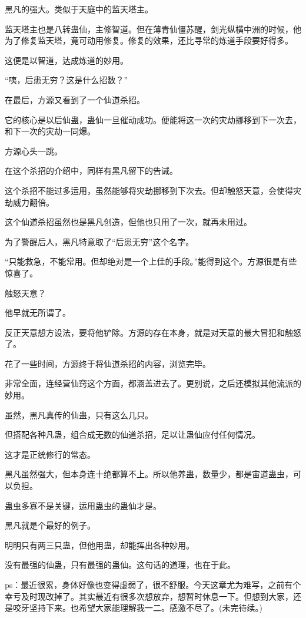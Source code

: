 \begin{this_body}
黑凡的强大。类似于天庭中的监天塔主。

监天塔主也是八转蛊仙，主修智道。但在薄青仙僵苏醒，剑光纵横中洲的时候，他为了修复监天塔，竟可动用修复。修复的效果，还比寻常的炼道手段要好得多。

这便是以智道，达成炼道的妙用。

“咦，后患无穷？这是什么招数？”

在最后，方源又看到了一个仙道杀招。

它的核心是以后仙蛊，蛊仙一旦催动成功。便能将这一次的灾劫挪移到下一次去，和下一次的灾劫一同爆。

方源心头一跳。

在这个杀招的介绍中，同样有黑凡留下的告诫。

这个杀招不能过多运用，虽然能够将灾劫挪移到下次去。但却触怒天意，会使得灾劫威力翻倍。

这个仙道杀招虽然也是黑凡创造，但他也只用了一次，就再未用过。

为了警醒后人，黑凡特意取了“后患无穷”这个名字。

“只能救急，不能常用。但却绝对是一个上佳的手段。”能得到这个。方源很是有些惊喜了。

触怒天意？

他早就无所谓了。

反正天意想方设法，要将他铲除。方源的存在本身，就是对天意的最大冒犯和触怒了。

花了一些时间，方源终于将仙道杀招的内容，浏览完毕。

非常全面，连经营仙窍这个方面，都涵盖进去了。更别说，之后还模拟其他流派的妙用。

虽然，黑凡真传的仙蛊，只有这么几只。

但搭配各种凡蛊，组合成无数的仙道杀招，足以让蛊仙应付任何情况。

这才是正统修行的常态。

黑凡虽然强大，但本身连十绝都算不上。所以他养蛊，数量少，都是宙道蛊虫，可以负担。

蛊虫多寡不是关键，运用蛊虫的蛊仙才是。

黑凡就是个最好的例子。

明明只有两三只蛊，但他用蛊，却能挥出各种妙用。

没有最强的仙蛊，只有最强的蛊仙。这句话的道理，也在于此。

ps：最近很累，身体好像也变得虚弱了，很不舒服。今天这章尤为难写，之前有个幸亏及时现改掉了。其实最近有很多次想放弃，想暂时休息一下。但想到大家，还是咬牙坚持下来。也希望大家能理解我一二。感激不尽了。(未完待续。)

\end{this_body}

